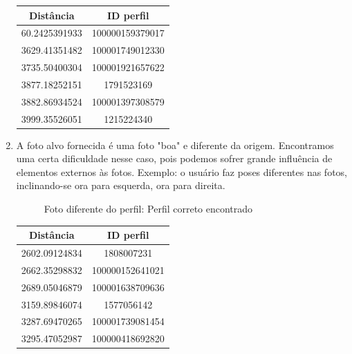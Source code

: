 \documentclass[10pt,a4paper]{article}
\begin{document}
\begin{enumerate}
\begin{table}[h!]
\begin{center}
\begin{tabular}{cc}
Distância & ID perfil \\
\hline
60.2425391933 & 100000159379017\\
3629.41351482 & 100001749012330\\
3735.50400304 & 100001921657622\\
3877.18252151 & 1791523169\\
3882.86934524 & 100001397308579\\
3999.35526051 & 1215224340
\end{tabular}
\end{center}
\end{table}



	\item A foto alvo fornecida é uma foto "boa" e diferente da origem. Encontramos uma certa dificuldade nesse caso, pois podemos sofrer grande influência de elementos externos às fotos. Exemplo: o usuário faz poses diferentes nas fotos, inclinando-se ora para esquerda, ora para direita.


\begin{flushleft}
\begin{figure}[h!]
\begin{flushleft}
  
\caption{Foto diferente do perfil: Perfil correto encontrado}
\par\end{flushleft}
\end{figure}
\par\end{flushleft}

\begin{table}[h!]
\begin{center}
\begin{tabular}{cc}
Distância & ID perfil \\
\hline
2602.09124834 & 1808007231\\
2662.35298832 & 100000152641021\\
2689.05046879 & 100001638709636\\
3159.89846074 & 1577056142\\
3287.69470265 & 100001739081454\\
3295.47052987 & 100000418692820
\end{tabular}
\end{center}
\end{table}



\end{enumerate}
\end{document}
